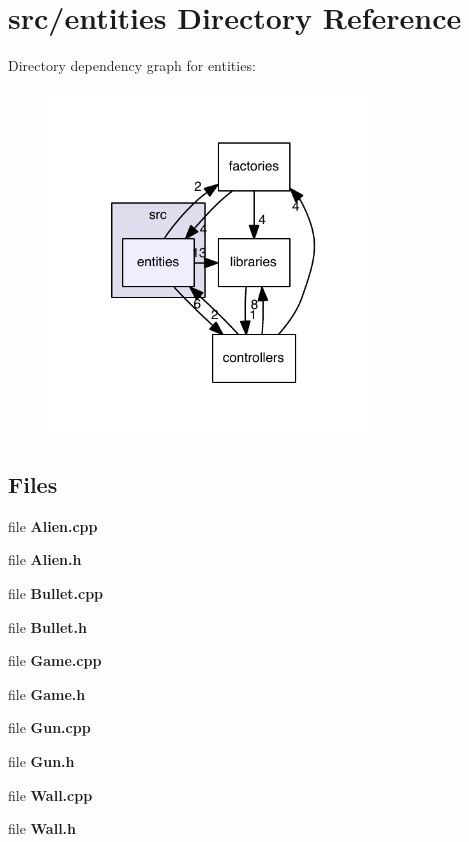 \section{src/entities Directory Reference}
\label{dir_d691984d1d74be3b164cee16192654be}
Directory dependency graph for entities\-:\nopagebreak
\begin{figure}[H]
\begin{center}
\leavevmode
\includegraphics[width=241pt]{dir_d691984d1d74be3b164cee16192654be_dep}
\end{center}
\end{figure}
\subsection*{Files}
\begin{DoxyCompactItemize}
\item 
file {\bf Alien.\-cpp}
\item 
file {\bf Alien.\-h}
\item 
file {\bf Bullet.\-cpp}
\item 
file {\bf Bullet.\-h}
\item 
file {\bf Game.\-cpp}
\item 
file {\bf Game.\-h}
\item 
file {\bf Gun.\-cpp}
\item 
file {\bf Gun.\-h}
\item 
file {\bf Wall.\-cpp}
\item 
file {\bf Wall.\-h}
\end{DoxyCompactItemize}
